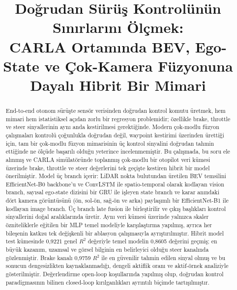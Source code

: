 \documentclass[conference]{IEEEtran}
\begin{document}
\title{Doğrudan Sürüş Kontrolünün Sınırlarını Ölçmek:\\ CARLA Ortamında BEV, Ego-State ve Çok-Kamera Füzyonuna Dayalı Hibrit Bir Mimari}

\author{
}

\maketitle

\begin{abstract}
End-to-end otonom sürüşte sensör verisinden doğrudan kontrol komutu üretmek, hem mimari hem istatistiksel açıdan zorlu bir regresyon problemidir; özellikle brake, throttle ve steer sinyallerinin aynı anda kestirilmesi gerektiğinde. Modern çok-modlu füzyon çalışmaları kontrolü çoğunlukla doğrudan değil, waypoint kestirimi üzerinden ürettiği için, tam bir çok-modlu füzyon mimarisinin üç kontrol sinyalini doğrudan tahmin ettiğinde ne ölçüde başarılı olduğu yeterince incelenmemiştir. Bu çalışmada, bu soru ele alınmış ve CARLA simülatöründe toplanmış çok-modlu bir otopilot veri kümesi üzerinde brake, throttle ve steer değerlerini tek geçişte kestiren hibrit bir model önerilmiştir. Model üç branch içerir: LiDAR nokta bulutundan üretilen BEV temsilini EfficientNet-B0 backbone'u ve ConvLSTM ile spatio-temporal olarak kodlayan vision branch, sayısal ego-state dizisini bir GRU ile işleyen state branch ve karar anındaki dört kamera görüntüsünü (ön, sol-ön, sağ-ön ve arka) paylaşımlı bir EfficientNet-B1 ile kodlayan image branch. Üç branch late fusion ile birleştirilir ve çıkış başlıkları kontrol sinyallerini doğal aralıklarında üretir. Aynı veri kümesi üzerinde yalnızca skaler özniteliklerle eğitilen bir MLP temel modeliyle karşılaştırma yapılmış, ayrıca her bileşenin katkısı tek değişkenli bir ablasyon çalışmasıyla ayrıştırılmıştır. Hibrit model test kümesinde 0,9221 genel $R^2$ değeriyle temel modelin 0,8605 değerini geçmiş; en büyük kazanım, uzamsal ve görsel bilginin en belirleyici olduğu steer kanalında gözlenmiştir. Brake kanalı 0,9759 $R^2$ ile en güvenilir tahmin edilen sinyal olmuş ve bu sonucun dengesizlikten kaynaklanmadığı, dengeli aktiflik oranı ve aktif-örnek analiziyle gösterilmiştir. Değerlendirme open-loop koşullarında yapılmış olup, doğrudan kontrol paradigmasının bilinen closed-loop kırılganlıkları ayrıntılı biçimde tartışılmıştır.
\end{abstract}
\end{document}
